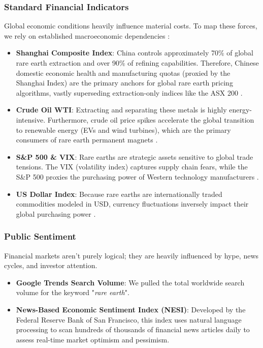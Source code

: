 \documentclass[11pt,a4paper]{article}
\begin{document}
\subsubsection{Standard Financial Indicators}
Global economic conditions heavily influence material costs. To map these forces, we rely on established macroeconomic dependencies \cite{henriques2023, ge2023, reboredo2020, zheng2021, akram2009}:
\begin{itemize}
    \item \textbf{Shanghai Composite Index}: China controls approximately 70\% of global rare earth extraction and over 90\% of refining capabilities. Therefore, Chinese domestic economic health and manufacturing quotas (proxied by the Shanghai Index) are the primary anchors for global rare earth pricing algorithms, vastly superseding extraction-only indices like the ASX 200 \cite{ge2023}.
    \item \textbf{Crude Oil WTI}: Extracting and separating these metals is highly energy-intensive. Furthermore, crude oil price spikes accelerate the global transition to renewable energy (EVs and wind turbines), which are the primary consumers of rare earth permanent magnets \cite{reboredo2020}.
    \item \textbf{S\&P 500 \& VIX}: Rare earths are strategic assets sensitive to global trade tensions. The VIX (volatility index) captures supply chain fears, while the S\&P 500 proxies the purchasing power of Western technology manufacturers \cite{zheng2021}.
    \item \textbf{US Dollar Index}: Because rare earths are internationally traded commodities modeled in USD, currency fluctuations inversely impact their global purchasing power \cite{akram2009}.
\end{itemize}

\subsubsection{Public Sentiment}
Financial markets aren't purely logical; they are heavily influenced by hype, news cycles, and investor attention.
\begin{itemize}
    \item \textbf{Google Trends Search Volume}: We pulled the total worldwide search volume for the keyword "\textit{rare earth}".
    \item \textbf{News-Based Economic Sentiment Index (NESI)}: Developed by the Federal Reserve Bank of San Francisco, this index uses natural language processing to scan hundreds of thousands of financial news articles daily to assess real-time market optimism and pessimism.
\end{itemize}
\end{document}
